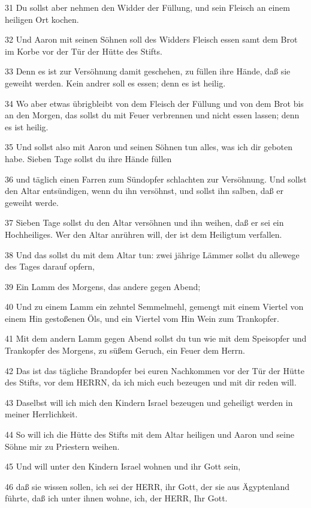 \par 31 Du sollst aber nehmen den Widder der Füllung, und sein Fleisch an einem heiligen Ort kochen.
\par 32 Und Aaron mit seinen Söhnen soll des Widders Fleisch essen samt dem Brot im Korbe vor der Tür der Hütte des Stifts.
\par 33 Denn es ist zur Versöhnung damit geschehen, zu füllen ihre Hände, daß sie geweiht werden. Kein andrer soll es essen; denn es ist heilig.
\par 34 Wo aber etwas übrigbleibt von dem Fleisch der Füllung und von dem Brot bis an den Morgen, das sollst du mit Feuer verbrennen und nicht essen lassen; denn es ist heilig.
\par 35 Und sollst also mit Aaron und seinen Söhnen tun alles, was ich dir geboten habe. Sieben Tage sollst du ihre Hände füllen
\par 36 und täglich einen Farren zum Sündopfer schlachten zur Versöhnung. Und sollst den Altar entsündigen, wenn du ihn versöhnst, und sollst ihn salben, daß er geweiht werde.
\par 37 Sieben Tage sollst du den Altar versöhnen und ihn weihen, daß er sei ein Hochheiliges. Wer den Altar anrühren will, der ist dem Heiligtum verfallen.
\par 38 Und das sollst du mit dem Altar tun: zwei jährige Lämmer sollst du allewege des Tages darauf opfern,
\par 39 Ein Lamm des Morgens, das andere gegen Abend;
\par 40 Und zu einem Lamm ein zehntel Semmelmehl, gemengt mit einem Viertel von einem Hin gestoßenen Öls, und ein Viertel vom Hin Wein zum Trankopfer.
\par 41 Mit dem andern Lamm gegen Abend sollst du tun wie mit dem Speisopfer und Trankopfer des Morgens, zu süßem Geruch, ein Feuer dem Herrn.
\par 42 Das ist das tägliche Brandopfer bei euren Nachkommen vor der Tür der Hütte des Stifts, vor dem HERRN, da ich mich euch bezeugen und mit dir reden will.
\par 43 Daselbst will ich mich den Kindern Israel bezeugen und geheiligt werden in meiner Herrlichkeit.
\par 44 So will ich die Hütte des Stifts mit dem Altar heiligen und Aaron und seine Söhne mir zu Priestern weihen.
\par 45 Und will unter den Kindern Israel wohnen und ihr Gott sein,
\par 46 daß sie wissen sollen, ich sei der HERR, ihr Gott, der sie aus Ägyptenland führte, daß ich unter ihnen wohne, ich, der HERR, Ihr Gott.

